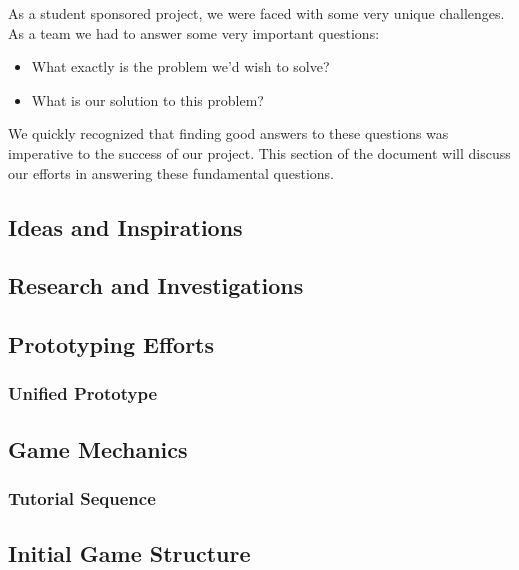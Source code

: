As a student sponsored project, we were faced with some very unique
challenges. As a team we had to answer some very important questions: 

\begin{itemize}
    \item What exactly is the problem we'd wish to solve?
    \item What is our solution to this problem?
\end{itemize}

We quickly recognized that finding good answers to these questions was imperative to the success of our project. 
This section of the document will discuss our efforts in answering these fundamental questions.

\subsection{Ideas and Inspirations}
    
\newpage

\subsection{Research and Investigations}
  
\newpage

\subsection{Prototyping Efforts}
  
  \subsubsection{Unified Prototype}
\newpage

\subsection{Game Mechanics}
\subsubsection{Tutorial Sequence} 
\label{section:tutorial}
  
\newpage
\subsection{Initial Game Structure}

\newpage